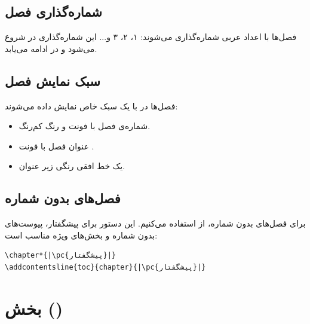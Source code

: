 \subsection{شماره‌گذاری فصل}
\label{sec:chapters-chapter-numbering}

فصل‌ها با اعداد عربی شماره‌گذاری می‌شوند: ۱، ۲،
۳ و... این شماره‌گذاری در 
شروع می‌شود و در  ادامه می‌یابد.

\subsection{سبک نمایش فصل}
\label{sec:chapters-chapter-style}

فصل‌ها در  با یک سبک خاص نمایش
داده می‌شوند:

\begin{itemize}
    \item شماره‌ی فصل با فونت \pnum{۲۴pt} و
    رنگ کم‌رنگ.
    \item عنوان فصل با فونت \pnum{۲۰pt}.
    \item یک خط افقی رنگی زیر عنوان.
\end{itemize}


\subsection{فصل‌های بدون شماره}
\label{sec:chapters-chapter-star}

برای فصل‌های بدون شماره، از 
استفاده می‌کنیم. این دستور برای پیشگفتار،
پیوست‌های بدون شماره و بخش‌های ویژه مناسب
است:

\begin{latin}
\begin{verbatim}
\chapter*{|\pc{پیشگفتار}|}
\addcontentsline{toc}{chapter}{|\pc{پیشگفتار}|}
\end{verbatim}
\end{latin}


\section{بخش ()}
\label{sec:chapters-section}

